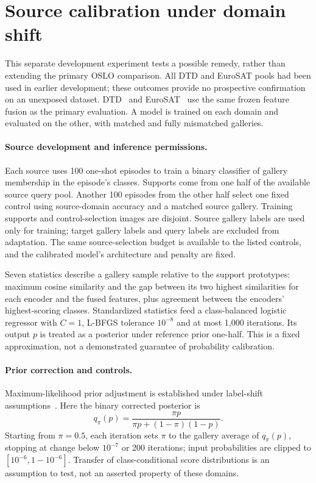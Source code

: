 \clearpage
\section{Source calibration under domain shift}\label{app:calibration}
This separate development experiment tests a possible remedy, rather than extending the primary OSLO comparison. All DTD and EuroSAT pools had been used in earlier development; these outcomes provide no prospective confirmation on an unexposed dataset. DTD~\citep{dtd} and EuroSAT~\citep{eurosat} use the same frozen feature fusion as the primary evaluation. A model is trained on each domain and evaluated on the other, with matched and fully mismatched galleries.

\paragraph{Source development and inference permissions.}
Each source uses 100 one-shot episodes to train a binary classifier of gallery membership in the episode's classes. Supports come from one half of the available source query pool. Another 100 episodes from the other half select one fixed control using source-domain accuracy and a matched source gallery. Training supports and control-selection images are disjoint. Source gallery labels are used only for training; target gallery labels and query labels are excluded from adaptation. The same source-selection budget is available to the listed controls, and the calibrated model's architecture and penalty are fixed.

Seven statistics describe a gallery sample relative to the support prototypes: maximum cosine similarity and the gap between its two highest similarities for each encoder and the fused features, plus agreement between the encoders' highest-scoring classes. Standardized statistics feed a class-balanced logistic regressor with $C=1$, L-BFGS tolerance $10^{-8}$ and at most 1,000 iterations. Its output $p$ is treated as a posterior under reference prior one-half. This is a fixed approximation, not a demonstrated guarantee of probability calibration.

\paragraph{Prior correction and controls.}
Maximum-likelihood prior adjustment is established under label-shift assumptions~\citep{alexandari2020}. Here the binary corrected posterior is
\[
 q_\pi(p)=\frac{\pi p}{\pi p+(1-\pi)(1-p)}.
\]
Starting from $\pi=0.5$, each iteration sets $\pi$ to the gallery average of $q_\pi(p)$, stopping at change below $10^{-7}$ or 200 iterations; input probabilities are clipped to $[10^{-6},1-10^{-6}]$. Transfer of class-conditional score distributions is an assumption to test, not an asserted property of these domains.

